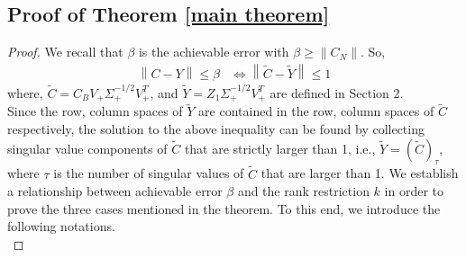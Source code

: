 \documentclass[11pt]{article}
\newcommand{\rank}{\operatorname{rank}}
\newcommand{\norm}[1]{\left\|#1\right\|}
\newcommand{\Leq}{\preceq}
\begin{document}
%
\subsection{Proof of Theorem \ref{main theorem}}
%
\begin{proof}
We recall that $\beta$ is the achievable error with $\beta \geq \norm{C_N}$. So,
\begin{align*}
\norm{{C} - {Y}} \leq \beta  
& \iff \norm{ \tilde{C} - \tilde{Y} } \leq 1
\end{align*}
%
where, \quad $\tilde{C} = C_BV_+{\Sigma}^{-1/2}_+V_+^T$, \quad and \quad $\tilde{Y} = Z_1{\Sigma}^{-1/2}_+V_+^T$ are defined in Section 2.\\
Since the row, column spaces of $\tilde Y$ are contained in the row, column spaces of $\tilde C$ respectively, the solution to the above inequality can be found by collecting singular value components of $\tilde{C}$ that are strictly larger than 1, i.e., $\tilde{Y} = (\tilde{C})_{\tau}$, where $\tau$ is the number of singular values of $\tilde{C}$ that are larger than 1. We establish a relationship between achievable error $\beta$ and the rank restriction $k$ in order to prove the three cases mentioned in the theorem. To this end, we introduce the following notations.\\  

\end{proof}
\end{document}
